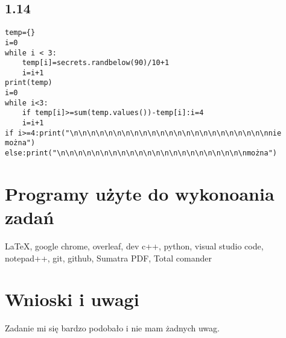 \documentclass[a4paper,11pt]{article}
\begin{document}
\subsection*{1.14}
\begin{minipage}{3cm}
\begin{verbatim}
temp={}
i=0
while i < 3:
    temp[i]=secrets.randbelow(90)/10+1
    i=i+1
print(temp)
i=0
while i<3:
    if temp[i]>=sum(temp.values())-temp[i]:i=4
    i=i+1
if i>=4:print("\n\n\n\n\n\n\n\n\n\n\n\n\n\n\n\n\n\n\n\n\n\n\nnie można")
else:print("\n\n\n\n\n\n\n\n\n\n\n\n\n\n\n\n\n\n\n\n\n\nmożna")
\end{verbatim}
\end{minipage}


\section{Programy użyte do wykonoania zadań}  
\LaTeX, google chrome, overleaf, dev c++, python, visual studio code, notepad++, git, github, Sumatra PDF, Total comander  
\section{Wnioski i uwagi} 
\begin{center}
 \large{Zadanie mi się bardzo podobało i nie mam żadnych uwag.}   
\end{center}
 
\end{document}
